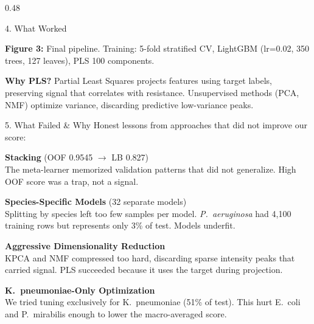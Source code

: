 \documentclass[final]{beamer}
\begin{document}
\begin{frame}[t]
\begin{columns}[t,totalwidth=\textwidth]
\begin{column}{0.48\textwidth}
\begin{block}{4. What Worked}
\vspace{0.3em}
\begin{center}
{\normalsize\textbf{Figure 3:} Final pipeline. Training: 5-fold stratified CV, LightGBM (lr=0.02, 350 trees, 127 leaves), PLS 100 components.}
\end{center}

\vspace{0.5em}
\textbf{Why PLS?} Partial Least Squares projects features using target labels, preserving signal that correlates with resistance. Unsupervised methods (PCA, NMF) optimize variance, discarding predictive low-variance peaks.
\end{block}

\begin{block}{5. What Failed \& Why}
Honest lessons from approaches that did not improve our score:

\vspace{0.6em}
\textbf{Stacking} (OOF 0.9545 $\rightarrow$ LB 0.827)\\[0.2em]
The meta-learner memorized validation patterns that did not generalize. High OOF score was a trap, not a signal.

\vspace{0.5em}
\textbf{Species-Specific Models} (32 separate models)\\[0.2em]
Splitting by species left too few samples per model. \textit{P.~aeruginosa} had 4,100 training rows but represents only 3\% of test. Models underfit.

\vspace{0.5em}
\textbf{Aggressive Dimensionality Reduction}\\[0.2em]
KPCA and NMF compressed too hard, discarding sparse intensity peaks that carried signal. PLS succeeded because it uses the target during projection.

\vspace{0.5em}
\textbf{K.~pneumoniae-Only Optimization}\\[0.2em]
We tried tuning exclusively for K.~pneumoniae (51\% of test). This hurt E.~coli and P.~mirabilis enough to lower the macro-averaged score.

\vspace{0.8em}
\begin{center}
\end{center}
\end{block}


\end{column}
\end{columns}
\end{frame}
\end{document}
